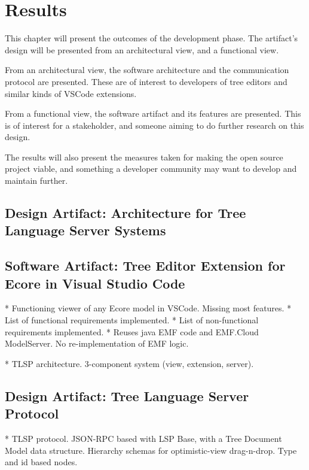 \chapter{Results}\label{chap:results}

This chapter will present the outcomes of the development phase.
The artifact's design will be presented from an architectural view, and a functional view.

From an architectural view, the software architecture and the communication protocol are presented.
These are of interest to developers of tree editors and similar kinds of \gls{VSCode} extensions.

From a functional view, the software artifact and its features are presented.
This is of interest for a stakeholder, and someone aiming to do further research on this design.

The results will also present the measures taken for making the \gls{open source} project viable, and something a developer community may want to develop and maintain further.


\section{Design Artifact: Architecture for Tree Language Server Systems}




\section{Software Artifact: Tree Editor Extension for Ecore in Visual Studio Code}
* Functioning viewer of any Ecore model in VSCode. Missing most features.
  * List of functional requirements implemented.
  * List of non-functional requirements implemented.
* Reuses java EMF code and EMF.Cloud ModelServer. No re-implementation of EMF logic.

* TLSP architecture. 3-component system (view, extension, server).

\section{Design Artifact: Tree Language Server Protocol}\label{sec:tlsp}



* TLSP protocol. JSON-RPC based with LSP Base, with a Tree Document Model data structure. Hierarchy schemas for optimistic-view drag-n-drop. Type and id based nodes. 

